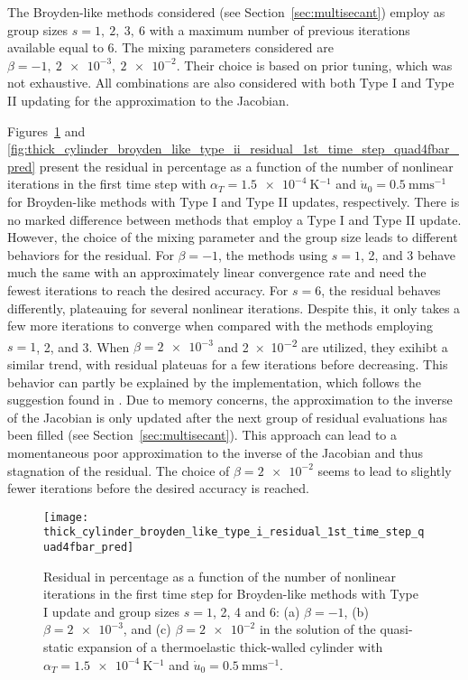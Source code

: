 The Broyden-like methods considered (see Section~\ref{sec:multisecant}) employ as group sizes \(s=1,\ 2,\ 3,\ 6\) with a maximum number of previous iterations available equal to 6.
The mixing parameters considered are \(\beta=-1,\ \num{2e-3},\ \num{2e-2}\).
Their choice is based on prior tuning, which was not exhaustive.
All combinations are also considered with both Type I and Type II updating for the approximation to the Jacobian.

Figures~\ref{fig:thick_cylinder_broyden_like_type_i_residual_1st_time_step_quad4fbar_pred} and \ref{fig:thick_cylinder_broyden_like_type_ii_residual_1st_time_step_quad4fbar_pred} present the residual in percentage as a function of the number of nonlinear iterations in the first time step with \(\alpha_T=\SI{1.5e-4}{\kelvin^{-1}}\) and \(\dot u_0 =\SI{0.5}{\milli\meter\second^{-1}}\) for Broyden-like methods with Type I and Type II updates, respectively.
There is no marked difference between methods that employ a Type I and Type II update.
However, the choice of the mixing parameter and the group size leads to different behaviors for the residual.
For \(\beta=-1\), the methods using \(s=1\), 2, and 3 behave much the same with an approximately linear convergence rate and need the fewest iterations to reach the desired accuracy.
For \(s=6\), the residual behaves differently, plateauing for several nonlinear iterations.
Despite this, it only takes a few more iterations to converge when compared with the methods employing \(s=1\), 2, and 3.
When \(\beta=\num{2e-3}\) and \num{2e-2} are utilized, they exihibt a similar trend, with residual plateuas for a few iterations before decreasing.
This behavior can partly be explained by the implementation, which follows the suggestion found in \cite{fang_two_2009}.
Due to memory concerns, the approximation to the inverse of the Jacobian is only updated after the next group of residual evaluations has been filled (see Section~\ref{sec:multisecant}).
This approach can lead to a momentaneous poor approximation to the inverse of the Jacobian and thus stagnation of the residual.
The choice of \(\beta=\num{2e-2}\) seems to lead to slightly fewer iterations before the desired accuracy is reached.

\begin{figure}[htbp]
 \centering
 \texttt{[image: thick\_cylinder\_broyden\_like\_type\_i\_residual\_1st\_time\_step\_quad4fbar\_pred]}
 \caption{Residual in percentage as a function of the number of nonlinear iterations in the first time step for Broyden-like methods with Type I update and group sizes \(s=1\), 2, 4 and 6: (a) \(\beta=-1\), (b) \(\beta=\num{2e-3}\), and (c) \(\beta=\num{2e-2}\) in the solution of the quasi-static expansion of a thermoelastic thick-walled cylinder with \(\alpha_T=\SI{1.5e-4}{\kelvin^{-1}}\) and \(\dot u_0 =\SI{0.5}{\milli\meter\second^{-1}}\).}
\label{fig:thick_cylinder_broyden_like_type_i_residual_1st_time_step_quad4fbar_pred}
\end{figure}

